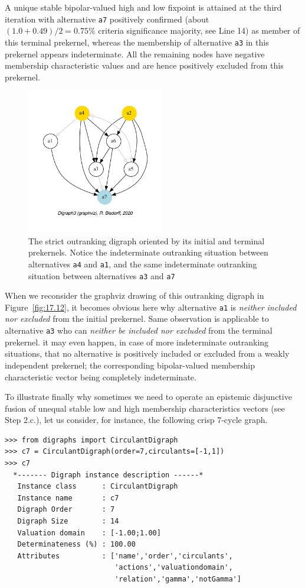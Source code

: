 A unique stable bipolar-valued high and low fixpoint is attained at the third iteration with alternative \texttt{a7} positively confirmed (about $(1.0+0.49)/2 = 0.75\%$ criteria significance majority, see Line 14) as member of this terminal prekernel, whereas the membership of alternative \texttt{a3} in this prekernel appears indeterminate. All the remaining nodes have negative membership characteristic values and are hence positively excluded from this prekernel.
\begin{figure}[ht]
\sidecaption[t]
\includegraphics[width=6cm]{Figures/17-12-bestWorstOrientation.pdf}
\caption{The strict outranking digraph oriented by its initial and terminal prekernels. Notice the indeterminate outranking situation between alternatives \texttt{a4} and \texttt{a1}, and the same indeterminate outranking situation between alternatives \texttt{a3} and \texttt{a7}}
\label{fig:17.12}       %
\end{figure}

When we reconsider the graphviz drawing of this outranking digraph in Figure~\vref{fig:17.12}, it becomes obvious here why alternative \texttt{a1} is \emph{neither included nor excluded} from the initial prekernel. Same observation is applicable to alternative \texttt{a3} who can \emph{neither be included nor excluded} from the terminal prekernel. it may even happen, in case of more indeterminate outranking situations, that no alternative  is positively included or excluded from a weakly independent prekernel; the corresponding bipolar-valued membership characteristic vector being completely indeterminate.

To illustrate finally why sometimes we need to operate an epistemic disjunctive fusion of unequal stable low and high membership characteristics vectors (see Step 2.c.), let us consider, for instance, the following crisp 7-cycle graph.
\begin{lstlisting}
>>> from digraphs import CirculantDigraph
>>> c7 = CirculantDigraph(order=7,circulants=[-1,1])
>>> c7			     
  *------- Digraph instance description ------*
   Instance class      : CirculantDigraph
   Instance name       : c7
   Digraph Order       : 7
   Digraph Size        : 14
   Valuation domain    : [-1.00;1.00]
   Determinateness (%) : 100.00
   Attributes          : ['name','order','circulants',
                          'actions','valuationdomain',
                          'relation','gamma','notGamma']
\end{lstlisting}		       

